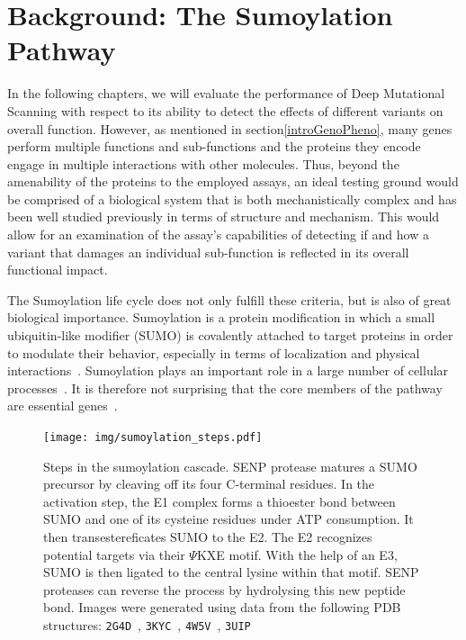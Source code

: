 
\section{Background: The Sumoylation Pathway}
\label{intro:sumoylation}

In the following chapters, we will evaluate the performance of Deep Mutational Scanning with respect to its ability to detect the effects of different variants on overall function. However, as mentioned in section\ref{introGenoPheno}, many genes perform multiple functions and sub-functions and the proteins they encode engage in multiple interactions with other molecules. Thus, beyond the amenability of the proteins to the employed assays, an ideal testing ground would be comprised of a biological system that is both mechanistically complex and has been well studied previously in terms of structure and mechanism. This would allow for an examination of the assay's capabilities of detecting if and how a variant that damages an individual sub-function is reflected in its overall functional impact. 

The Sumoylation life cycle does not only fulfill these criteria, but is also of great biological importance. Sumoylation is a protein modification in which a small ubiquitin-like modifier (SUMO) is covalently attached to target proteins in order to modulate their behavior, especially in terms of localization and physical interactions~\cite{geiss-friedlander_concepts_2007}. Sumoylation plays an important role in a large number of cellular processes~\cite{geiss-friedlander_concepts_2007}. It is therefore not surprising that the core members of the pathway are essential genes~\cite{nacerddine_sumo_2005}.

\begin{figure}
	\centering
	\texttt{[image: img/sumoylation\_steps.pdf]}
	\caption{Steps in the sumoylation cascade. SENP protease matures a SUMO precursor by cleaving off its four C-terminal residues. In the activation step, the E1 complex forms a thioester bond  between SUMO and one of its cysteine residues under ATP consumption. It then transestereficates SUMO to the E2. The E2 recognizes potential targets via their $\Psi$KXE motif. With the help of an E3, SUMO is then ligated to the central lysine within that motif. SENP proteases can reverse the process by hydrolysing this new peptide bond. Images were generated using data from the following PDB structures: \texttt{2G4D}~\cite{xu_crystal_2006}, \texttt{3KYC}~\cite{olsen_active_2010}, \texttt{4W5V}~\cite{reiter_characterization_2016}, \texttt{3UIP}~\cite{gareau_determinants_2012}}
	\label{fig:sumoylation_steps}
\end{figure}

